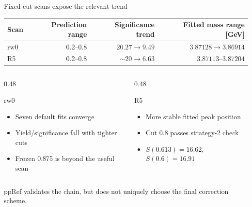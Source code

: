 \documentclass[11pt,aspectratio=169]{beamer}
\newcommand{\HL}[1]{\textcolor{emphasis}{#1}}
\begin{document}
\begin{frame}{Fixed-cut scans expose the relevant trend}
  \vspace{4pt}
  \begin{center}
    \small
    \begin{tabular}{lrrr}
      \toprule
      Scan & Prediction range & Significance trend & Fitted mass range [GeV] \\
      \midrule
      rw0 & 0.2--0.8 & $20.27 \rightarrow 9.49$ & $3.87128 \rightarrow 3.86914$ \\
      R5  & 0.2--0.8 & $\sim20 \rightarrow 6.63$ & $3.87113$--$3.87204$ \\
      \bottomrule
    \end{tabular}
  \end{center}
  \vspace{0.6em}
  \begin{columns}[T]
    \begin{column}{0.48\textwidth}
      \begin{block}{rw0}
        \begin{itemize}
          \item Seven default fits converge
          \item Yield/significance fall with tighter cuts
          \item Frozen 0.875 is beyond the useful scan
        \end{itemize}
      \end{block}
    \end{column}
    \begin{column}{0.48\textwidth}
      \begin{exampleblock}{R5}
        \begin{itemize}
          \item More stable fitted peak position
          \item Cut 0.8 passes strategy-2 check
          \item $S(0.613)=16.62$, $S(0.6)=16.91$
        \end{itemize}
      \end{exampleblock}
    \end{column}
  \end{columns}
  \vfill
  \centering\small
  \HL{ppRef validates the chain, but does not uniquely choose the final correction scheme.}
\end{frame}
\end{document}
